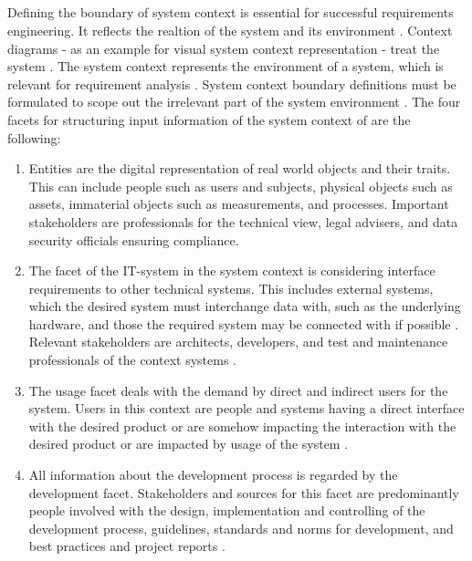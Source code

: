 \subparagraph{} \label{beginFacets} Defining the boundary of system context is essential for successful requirements engineering. It reflects the realtion of the system and its environment \parencite[55]{Pohl.2007}. Context diagrams - as an example for visual system context representation \parencites[cf.][266]{Kossiakoff.2011} - treat the system  \parencite[76]{Lauesen.2008}. The system context represents the environment of a system, which is relevant for requirement analysis \parencite[55]{Pohl.2007}. System context boundary definitions must be formulated to scope out the irrelevant part of the system environment \parencite[55-56]{Pohl.2007}. The four facets for structuring input information of the system context of \textcite{Pohl.2007} are the following:
\begin{enumerate}
    \item Entities are the digital representation of real world objects and their traits. This can include people such as users and subjects, physical objects such as assets, immaterial objects such as measurements, and processes. Important stakeholders are  professionals for the technical view, legal advisers, and data security officials ensuring compliance. \parencite[cf.][70-71]{Pohl.2007}
    \item The facet of the IT-system in the system context is considering interface requirements to other technical systems. This includes external systems, which the desired system must interchange data with, such as the underlying hardware, and those the required system may be connected with if possible \parencite[cf.][192]{Kotonya.2000}. Relevant stakeholders are architects, developers, and test and maintenance professionals of the context systems \parencite[cf.][72]{Pohl.2007}.
    \item The usage facet deals with the demand by direct and indirect users for the system. Users in this context are people and systems having a direct interface with the desired product or are somehow impacting the interaction with the desired product or are impacted by usage of the system \parencite[cf.][75-77]{Pohl.2007}.
    \item All information about the development process is regarded by the development facet. Stakeholders and sources for this facet are predominantly people involved with the design, implementation and controlling of the development process, guidelines, standards and norms for development, and best practices and project reports \parencite[cf.][79]{Pohl.2007}.
\end{enumerate}
